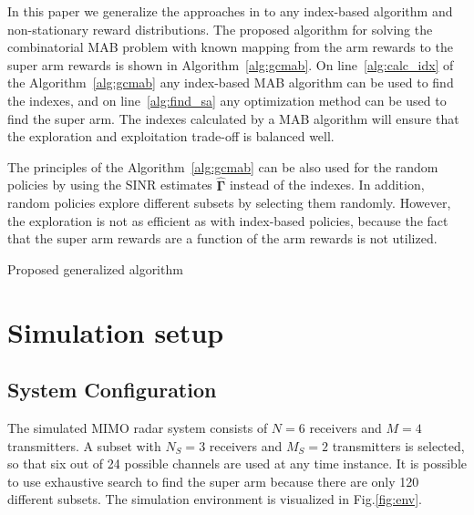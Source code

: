 \documentclass[conference]{IEEEtran}
\newcommand{\vsinrb}{\widehat{\boldsymbol{\Gamma}}}
\begin{document}
In this paper we generalize the approaches in \cite{Mukherjee2012, Kuai2019} to any index-based algorithm and non-stationary reward distributions. 
The proposed algorithm for solving the combinatorial MAB problem with known mapping from the arm rewards to the super arm rewards is shown in Algorithm~\ref{alg:gcmab}.
On line~\ref{alg:calc_idx} of the Algorithm~\ref{alg:gcmab} any index-based MAB algorithm can be used to find the indexes, and on line~\ref{alg:find_sa} any optimization method can be used to find the super arm.
The indexes calculated by a MAB algorithm will ensure that the exploration and exploitation trade-off is balanced well.

The principles of the Algorithm~\ref{alg:gcmab} can be also used for the random policies by using the SINR estimates $\vsinrb$ instead of the indexes.
In addition, random policies explore different subsets by selecting them randomly.
However, the exploration is not as efficient as with index-based policies, because the fact that the super arm rewards are a function of the arm rewards is not utilized.

\begin{algorithm}[h]
\SetAlgoLined
{}
\caption{Proposed generalized algorithm}
\label{alg:gcmab}
\end{algorithm}

\section{Simulation setup}
\label{sec:sim}


\subsection{System Configuration}
\label{seq:sys_conf}
The simulated MIMO radar system consists of $N=6$ receivers and $M=4$ transmitters.
A subset with $N_S=3$ receivers and $M_S=2$ transmitters is selected, so that six out of 24 possible channels are used at any time instance.
It is possible to use exhaustive search to find the super arm because there are only 120 different subsets.
The simulation environment is visualized in Fig.\ref{fig:env}.
\end{document}
